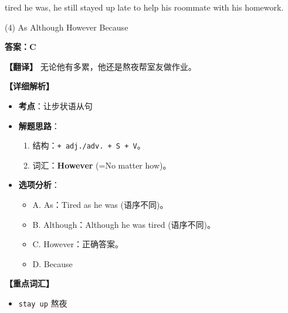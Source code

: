 \documentclass[11pt, a4paper]{article}
\newcommand{\analysis}[4]{
    \begin{solutionbox}
        \textbf{答案：#1}
        
        \textbf{【翻译】} #2
        
        \textbf{【详细解析】}
        #3
        
        \textbf{【重点词汇】}
        #4
    \end{solutionbox}
}
\newcommand{\blank}{\underline{\hspace{1.5cm}}}
\begin{document}
\begin{questions}
    \item \blank tired he was, he still stayed up late to help his roommate with his homework.
    \begin{tasks}(4)
        \task As \task Although \task However \task Because
    \end{tasks}
    \analysis{C}{无论他有多累，他还是熬夜帮室友做作业。}{
        \begin{itemize}
            \item \textbf{考点}：让步状语从句
            \item \textbf{解题思路}：
                \begin{enumerate}
                    \item 结构：\texttt{\blank + adj./adv. + S + V}。
                    \item 词汇：\textbf{However} (=No matter how)。
                \end{enumerate}
            \item \textbf{选项分析}：
                \begin{itemize}
                    \item A. As：Tired as he was (语序不同)。
                    \item B. Although：Although he was tired (语序不同)。
                    \item C. However：正确答案。
                    \item D. Because
                \end{itemize}
        \end{itemize}
    }{
        \begin{itemize}
            \item \texttt{stay up} 熬夜
        \end{itemize}
    }


\end{questions}
\end{document}
